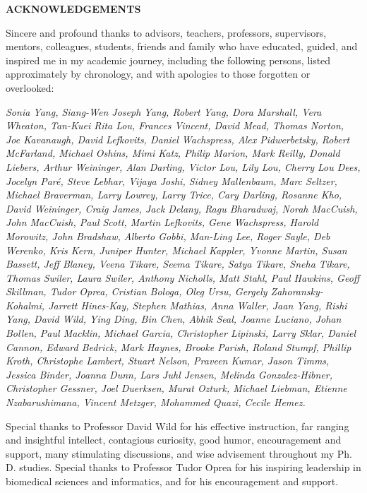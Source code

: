 \begin{centering}
\textbf{ACKNOWLEDGEMENTS}\\
\vspace{\baselineskip}
\end{centering}

Sincere and profound thanks to advisors, teachers, professors, supervisors, mentors, colleagues, students, friends and family who have educated, guided, and inspired me in my academic journey, including the following persons, listed approximately by chronology, and with apologies to those forgotten or overlooked:

\begin{singlespace}
\textit{Sonia Yang, Siang-Wen Joseph Yang, Robert Yang, Dora Marshall,
Vera Wheaton, Tan-Kuei Rita Lou, Frances Vincent, David Mead, Thomas
Norton, Joe Kavanaugh, David Lefkovits, Daniel Wachspress, Alex
Pidwerbetsky, Robert McFarland, Michael Oshins, Mimi Katz, Philip
Marion, Mark Reilly, Donald Liebers, Arthur Weininger, Alan Darling,
Victor Lou, Lily Lou, Cherry Lou Dees, Jocelyn Par\'e, Steve Lebhar,
Vijaya Joshi, Sidney Mallenbaum, Marc Seltzer, Michael Braverman, Larry
Lowrey, Larry Trice, Cary Darling, Rosanne Kho, David Weininger, Craig
James, Jack Delany, Ragu Bharadwaj, Norah MacCuish, John MacCuish, Paul
Scott, Martin Lefkovits, Gene Wachspress, Harold Morowitz, John
Bradshaw, Alberto Gobbi, Man-Ling Lee, Roger Sayle, Deb Werenko, Kris
Kern, Juniper Hunter, Michael Kappler, Yvonne Martin, Susan Bassett,
Jeff Blaney, Veena Tikare, Seema Tikare, Satya Tikare, Sneha Tikare,
Thomas Swiler, Laura Swiler, Anthony Nicholls, Matt Stahl, Paul
Hawkins, Geoff Skillman, Tudor Oprea, Cristian Bologa, Oleg Ursu,
Gergely Zahoransky-Kohalmi, Jarrett Hines-Kay, Stephen Mathias, Anna
Waller, Jaan Yang, Rishi Yang, David Wild, Ying Ding, Bin Chen, Abhik
Seal, Joanne Luciano, Johan Bollen, Paul Macklin, Michael Garcia,
Christopher Lipinski, Larry Sklar, Daniel Cannon, Edward Bedrick,
Mark Haynes, Brooke Parish, Roland Stumpf, Phillip Kroth, Christophe Lambert,
Stuart Nelson, Praveen Kumar, Jason Timms, Jessica Binder, Joanna Dunn, 
Lars Juhl Jensen, Melinda Gonzalez-Hibner, Christopher Gessner, Joel Duerksen,
Murat Ozturk, Michael Liebman, Etienne Nzabarushimana, Vincent Metzger, 
Mohammed Quazi, Cecile Hemez.}
\end{singlespace}

Special thanks to Professor David Wild for his effective instruction, far ranging and insightful intellect, contagious curiosity, good humor, encouragement and support, many stimulating discussions, and wise advisement throughout my Ph. D. studies. Special thanks to Professor Tudor Oprea for his inspiring leadership in biomedical sciences and informatics, and for his encouragement and support. 
